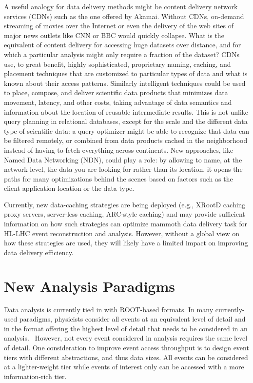 \documentclass[12pt,a4paper]{article}
\begin{document}
A useful analogy for data delivery methods might be content delivery
network services (CDNs) such as the one offered by Akamai. Without CDNs,
on-demand streaming of movies over the Internet or even the delivery of
the web sites of major news outlets like CNN or BBC would quickly
collapse. What is the equivalent of content delivery for accessing huge
datasets over distance, and for which a particular analysis might only
require a fraction of the dataset? CDNs use, to great benefit, highly
sophisticated, proprietary naming, caching, and placement techniques
that are customized to particular types of data and what is known about
their access patterns. Similarly intelligent techniques could be used to
place, compose, and deliver scientific data products that minimizes data
movement, latency, and other costs, taking advantage of data semantics
and information about the location of reusable intermediate results.
This is not unlike query planning in relational databases, except for
the scale and the different data type of scientific data: a query
optimizer might be able to recognize that data can be filtered remotely,
or combined from data products cached in the neighborhood instead of
having to fetch everything across continents. New approaches, like Named
Data Networking (NDN), could play a role: by allowing to name, at the
network level, the data you are looking for rather than its location, it
opens the paths for many optimizations behind the scenes based on
factors such as the client application location or the data type.

Currently, new data-caching strategies are being deployed (e.g., XRootD
caching proxy servers, server-less caching, ARC-style caching) and may
provide sufficient information on how such strategies can optimize
mammoth data delivery task for HL-LHC event reconstruction and analysis.
However, without a global view on how these strategies are used, they
will likely have a limited impact on improving data delivery efficiency.

\section{New Analysis Paradigms}\label{new-analysis-paradigms}

Data analysis is currently tied in with ROOT-based formats. In many
currently-used paradigms, physicists consider all events at an
equivalent level of detail and in the format offering the highest level
of detail that needs to be considered in an analysis. ~However, not
every event considered in analysis requires the same level of detail.
One consideration to improve event access throughput is to design event
tiers with different abstractions, and thus data sizes. All events can
be considered at a lighter-weight tier while events of interest only can
be accessed with a more information-rich tier.
\end{document}
